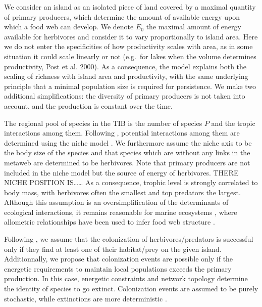 We consider an island as an isolated piece of land covered by a maximal
quantity of primary producers, which determine the amount of available
energy upon which a food web can develop. We denote \(E_0\) the maximal
amount of energy available for herbivores and consider it to vary
proportionally to island area. Here we do not enter the specificities of
how productivity scales with area, as in some situation it could scale
linearly or not (e.g.~for lakes when the volume determines productivity,
Post et al. 2000). As a consequence, the model explains both the scaling
of richness with island area and productivity, with the same underlying
principle that a minimal population size is required for persistence. We
make two additional simplifications: the diversity of primary producers
is not taken into account, and the production is constant over the time.

The regional pool of species in the TIB is the number of species \(P\)
and the tropic interactions among them. Following \citet{Cazelles2015a},
potential interactions among them are determined using the niche model
\citep{Williams2000}. We furthermore assume the niche axis to be the
body size of the species \citep{Gravel2013} and that species which are
without any links in the metaweb are determined to be herbivores. Note
that primary producers are not included in the niche model but the
source of energy of herbivores. THERE NICHE POSITION IS\ldots{}\ldots{}
As a consequence, trophic level is strongly correlated to body mass,
with herbivores often the smallest and top predators the largest.
Although this assumption is an oversimplification of the determinants of
ecological interactions, it remains reasonable for marine ecosystems
\citep{Trebilco2013}, where allometric relationships have been used to
infer food web structure \citep{Gravel2013}.

Following \citet{Gravel2011}, we assume that the colonization of
herbivores/predators is successful only if they find at least one of
their habitat/prey on the given island. Additionnally, we propose that
colonization events are possible only if the energetic requirements to
maintain local populations exceeds the primary production. In this case,
energetic constraints and network topology determine the identity of
species to go extinct. Colonization events are assumed to be purely
stochastic, while extinctions are more deterministic \citep[this
difference in stochastic nature between these fundamental processes of
biogeography has been recently supported in][]{Cirtwill2015}.

